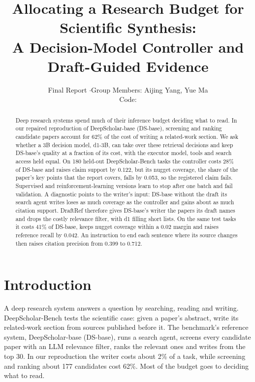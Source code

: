 \documentclass[11pt, letterpaper]{article}
\title{\vspace{-2em}\bfseries Allocating a Research Budget for Scientific Synthesis:\\
A Decision-Model Controller and Draft-Guided Evidence}
\author{Final Report \quad$\cdot$\quad Group Members: Aijing Yang, Yue Ma\\[2pt]
\normalsize Code: \repo}
\date{}
\begin{document}
\maketitle
\vspace{-2em}

\begin{abstract}
\noindent
Deep research systems spend much of their inference budget deciding what to read. In our repaired
reproduction of DeepScholar-base (DS-base), screening and ranking candidate papers account for 62\%
of the cost of writing a related-work section. We ask whether a 3B decision model, d1-3B, can take
over these retrieval decisions and keep DS-base's quality at a fraction of its cost, with the
executor model, tools and search access held equal. On 180 held-out DeepScholar-Bench tasks the
controller costs 28\% of DS-base and raises claim support by 0.122, but its nugget coverage, the
share of the paper's key points that the report covers, falls by 0.053, so the registered claim
fails. Supervised and reinforcement-learning versions learn to stop after one batch and fail
validation. A diagnostic points to the writer's input: DS-base without the draft its search agent
writes loses as much coverage as the controller and gains about as much citation support. DraftRef
therefore gives DS-base's writer the papers its draft names and drops the costly relevance filter,
with d1 filling short lists. On the same test tasks it costs 41\% of DS-base, keeps nugget coverage
within a 0.02 margin and raises reference recall by 0.042. An instruction to end each sentence where
its source changes then raises citation precision from 0.399 to 0.712.
\end{abstract}

\section{Introduction}

A deep research system answers a question by searching, reading and writing. DeepScholar-Bench
\cite{patel2025deepscholar} tests the scientific case: given a paper's abstract, write its
related-work section from sources published before it. The benchmark's reference system,
DeepScholar-base (DS-base), runs a search agent, screens every candidate paper with an LLM relevance
filter, ranks the relevant ones and writes from the top 30. In our reproduction the writer costs
about 2\% of a task, while screening and ranking about 177 candidates cost 62\%. Most of the budget
goes to deciding what to read.
\end{document}
